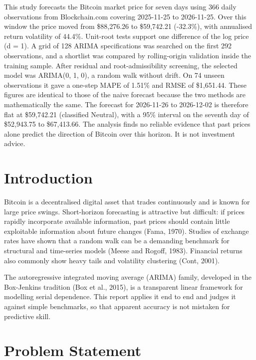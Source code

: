 \documentclass[11pt,a4paper]{article}
\begin{document}
This study forecasts the Bitcoin market price for seven days using 366 daily observations from Blockchain.com covering 2025-11-25 to 2026-11-25. Over this window the price moved from \$88,276.26 to \$59,742.21 (-32.3\%), with annualised return volatility of 44.4\%. Unit-root tests support one difference of the log price (d = 1). A grid of 128 ARIMA specifications was searched on the first 292 observations, and a shortlist was compared by rolling-origin validation inside the training sample. After residual and root-admissibility screening, the selected model was ARIMA(0, 1, 0), a random walk without drift. On 74 unseen observations it gave a one-step MAPE of 1.51\% and RMSE of \$1,651.44. These figures are identical to those of the naive forecast because the two methods are mathematically the same. The forecast for 2026-11-26 to 2026-12-02 is therefore flat at \$59,742.21 (classified Neutral), with a 95\% interval on the seventh day of \$52,943.75 to \$67,413.66. The analysis finds no reliable evidence that past prices alone predict the direction of Bitcoin over this horizon. It is not investment advice.

\clearpage

\section{Introduction}

Bitcoin is a decentralised digital asset that trades continuously and is known for large price swings. Short-horizon forecasting is attractive but difficult: if prices rapidly incorporate available information, past prices should contain little exploitable information about future changes (Fama, 1970). Studies of exchange rates have shown that a random walk can be a demanding benchmark for structural and time-series models (Meese and Rogoff, 1983). Financial returns also commonly show heavy tails and volatility clustering (Cont, 2001).

The autoregressive integrated moving average (ARIMA) family, developed in the Box-Jenkins tradition (Box et al., 2015), is a transparent linear framework for modelling serial dependence. This report applies it end to end and judges it against simple benchmarks, so that apparent accuracy is not mistaken for predictive skill.

\section{Problem Statement}
\end{document}
